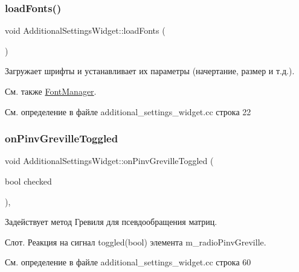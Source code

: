 \subsubsection{\texorpdfstring{load\+Fonts()}{loadFonts()}}
{\footnotesize\ttfamily void Additional\+Settings\+Widget\+::load\+Fonts (\begin{DoxyParamCaption}{ }\end{DoxyParamCaption})\hspace{0.3cm}{\ttfamily [private]}}



Загружает шрифты и устанавливает их параметры (начертание, размер и т.\+д.). 

\begin{DoxySeeAlso}{См. также}
\hyperlink{class_font_manager}{Font\+Manager}. 
\end{DoxySeeAlso}


См. определение в файле additional\+\_\+settings\+\_\+widget.\+cc строка 22

\hypertarget{class_additional_settings_widget_ae1174df17848122030d877a75ce5dd7d}{}\label{class_additional_settings_widget_ae1174df17848122030d877a75ce5dd7d} 
\subsubsection{\texorpdfstring{on\+Pinv\+Greville\+Toggled}{onPinvGrevilleToggled}}
{\footnotesize\ttfamily void Additional\+Settings\+Widget\+::on\+Pinv\+Greville\+Toggled (\begin{DoxyParamCaption}\item[{bool}]{checked }\end{DoxyParamCaption})\hspace{0.3cm}{\ttfamily [private]}, {\ttfamily [slot]}}



Задействует метод Гревиля для псевдообращения матриц. 

Слот. Реакция на сигнал toggled(bool) элемента m\+\_\+radio\+Pinv\+Greville. 

См. определение в файле additional\+\_\+settings\+\_\+widget.\+cc строка 60

\hypertarget{class_additional_settings_widget_a18833f1a993762babf170e952074cf50}{}\label{class_additional_settings_widget_a18833f1a993762babf170e952074cf50} 
